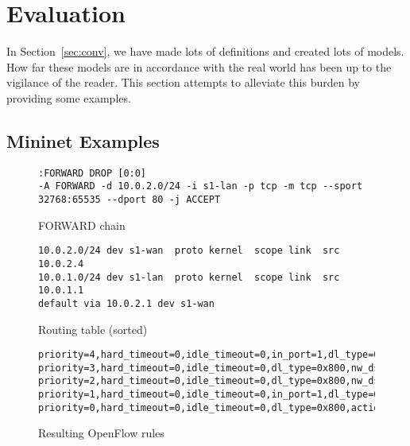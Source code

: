 \section{Evaluation}\label{sec:eval}
In Section~\ref{sec:conv}, we have made lots of definitions and created lots of models.
How far these models are in accordance with the real world has been up to the vigilance of the reader.
This section attempts to alleviate this burden by providing some examples.

\subsection{Mininet Examples}
\label{sec:mnex}
\begin{figure*}
\centering
\begin{subfigure}[b]{0.45\textwidth}
\begin{lstlisting}
:FORWARD DROP [0:0]
-A FORWARD -d 10.0.2.0/24 -i s1-lan -p tcp -m tcp --sport 32768:65535 --dport 80 -j ACCEPT
\end{lstlisting}
\caption{FORWARD chain}
\end{subfigure}
\hspace{0.05\textwidth}
\begin{subfigure}[b]{0.45\textwidth}
\begin{lstlisting}
10.0.2.0/24 dev s1-wan  proto kernel  scope link  src 10.0.2.4
10.0.1.0/24 dev s1-lan  proto kernel  scope link  src 10.0.1.1
default via 10.0.2.1 dev s1-wan
\end{lstlisting}
\caption{Routing table (sorted)}
\end{subfigure}
\begin{subfigure}{\textwidth}
\begin{lstlisting}
priority=4,hard_timeout=0,idle_timeout=0,in_port=1,dl_type=0x800,nw_proto=6,nw_dst=10.0.2.0/24,tp_src=32768/0x8000,tp_dst=80,action=output:2
priority=3,hard_timeout=0,idle_timeout=0,dl_type=0x800,nw_dst=10.0.2.0/24,action=drop
priority=2,hard_timeout=0,idle_timeout=0,dl_type=0x800,nw_dst=10.0.1.0/24,action=drop
priority=1,hard_timeout=0,idle_timeout=0,in_port=1,dl_type=0x800,nw_proto=6,nw_dst=10.0.2.0/24,tp_src=32768/0x8000,tp_dst=80,action=output:2
priority=0,hard_timeout=0,idle_timeout=0,dl_type=0x800,action=drop
\end{lstlisting}
\caption{Resulting OpenFlow rules}
\end{subfigure}
\caption{Example Network 1 -- Configuration}
\label{fig:exn1}
\end{figure*}
